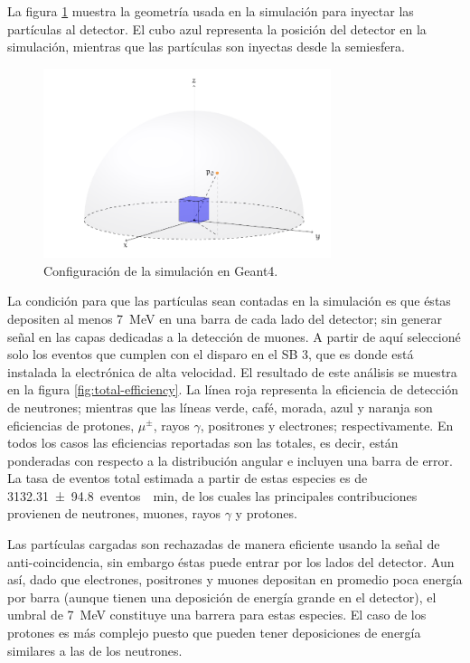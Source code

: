 La figura \ref{fig:sim-setup} muestra la geometría usada en la simulación para inyectar las partículas al detector. El cubo azul representa la posición del detector en la simulación, mientras que las partículas son inyectas desde la semiesfera.

\begin{figure}
        \centering
        \includegraphics[width=0.75\textwidth]{sim-setup.pdf}
        \caption{Configuración de la simulación en Geant4.}
        \label{fig:sim-setup}
\end{figure}

La condición para que las partículas sean contadas en la simulación es que éstas depositen al menos \SI{7}{\mega\electronvolt} en una barra de cada lado del detector; sin generar señal en las capas dedicadas a la detección de muones. A partir de aquí seleccioné solo los eventos que cumplen con el disparo en el SB \num{3}, que es donde está instalada la electrónica de alta velocidad. El resultado de este análisis se muestra en la figura \ref{fig:total-efficiency}. La línea roja representa la eficiencia de detección de neutrones; mientras que las líneas verde, café, morada, azul y naranja son eficiencias de protones, $\mu^{\pm}$, rayos $\gamma$, positrones y electrones; respectivamente. En todos los casos las eficiencias reportadas son las totales, es decir, están ponderadas con respecto a la distribución angular e incluyen una barra de error. La tasa de eventos total estimada a partir de estas especies es de \SI{3132.31(9480)}{eventos \per\minute}, de los cuales las principales contribuciones provienen de neutrones, muones, rayos $\gamma$ y protones.

Las partículas cargadas son rechazadas de manera eficiente usando la señal de anti-coincidencia, sin embargo éstas puede entrar por los lados del detector. Aun así, dado que electrones, positrones y muones depositan en promedio poca energía por barra (aunque tienen una deposición de energía grande en el detector), el umbral de \SI{7}{\mega\electronvolt} constituye una barrera para estas especies. El caso de los protones es más complejo puesto que pueden tener deposiciones de energía similares a las de los neutrones.

